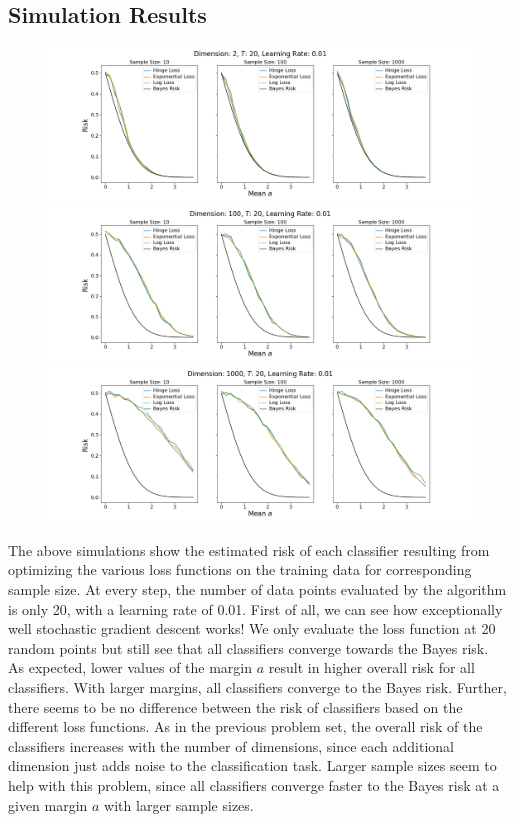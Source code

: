 \documentclass[a4paper, 11pt]{article} %
\begin{document}
\subsection*{Simulation Results}
\begin{figure}[H]
\centering
\includegraphics[scale=0.35]{Risk_Dimension_2}
\includegraphics[scale=0.35]{Risk_Dimension_100}
\includegraphics[scale=0.35]{Risk_Dimension_1000}
\end{figure}

The above simulations show the estimated risk of each classifier resulting from optimizing the various loss functions on the training data for corresponding sample size. At every step, the number of data points evaluated by the algorithm is only 20, with a learning rate of 0.01. First of all, we can see how exceptionally well stochastic gradient descent works! We only evaluate the loss function at 20 random points but still see that all classifiers converge towards the Bayes risk. \\
As expected, lower values of the margin $a$ result in higher overall risk for all classifiers. With larger margins, all classifiers converge to the Bayes risk. Further, there seems to be no difference between the risk of classifiers based on the different loss functions. As in the previous problem set, the overall risk of the classifiers increases with the number of dimensions, since each additional dimension just adds noise to the classification task.  Larger sample sizes seem to help with this problem, since all classifiers converge faster to the Bayes risk at a given margin $a$ with larger sample sizes.
\end{document}

